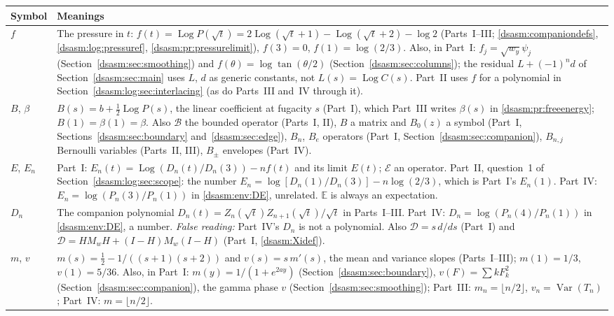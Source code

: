 \documentclass[11pt,letterpaper]{article}
\theoremstyle{remark}\newtheorem{remark}[theorem]{Remark}
\DeclareMathOperator{\Log}{Log}\DeclareMathOperator{\Var}{Var}
\begin{document}
\begin{longtable}{@{}>{\raggedright\arraybackslash}p{} >{\raggedright\arraybackslash}p{}@{}}
\toprule
Symbol & Meanings\\
\midrule
\endhead
$f$ & The pressure in $t$: $f(t)=\Log P(\sqrt t)=2\Log(\sqrt t+1)-\Log(\sqrt t+2)-\log2$ (Parts~I--III; \eqref{dsasm:companiondefs}, \eqref{dsasm:log:pressuref}, \eqref{dsasm:pr:pressurelimit}), $f(3)=0$, $f(1)=\log(2/3)$. Also, in Part~I: $f_j=\sqrt{w_y}\psi_j$ (Section~\ref{dsasm:sec:smoothing}) and $f(\theta)=\log\tan(\theta/2)$ (Section~\ref{dsasm:sec:columns}); the residual $L+(-1)^nd$ of Section~\ref{dsasm:sec:main} uses $L$, $d$ as generic constants, not $L(s)=\Log C(s)$. Part~II uses $f$ for a polynomial in Section~\ref{dsasm:log:sec:interlacing} (as do Parts~III and~IV through it).\\
$B$, $\beta$ & $B(s)=b+\frac12\Log P(s)$, the linear coefficient at fugacity $s$ (Part~I), which Part~III writes $\beta(s)$ in \eqref{dsasm:pr:freeenergy}; $B(1)=\beta(1)=\beta$. Also $\mathcal B$ the bounded operator (Parts~I, II), $B$ a matrix and $B_0(z)$ a symbol (Part~I, Sections~\ref{dsasm:sec:boundary} and~\ref{dsasm:sec:edge}), $B_n$, $B_e$ operators (Part~I, Section~\ref{dsasm:sec:companion}), $B_{n,j}$ Bernoulli variables (Parts~II, III), $B_\pm$ envelopes (Part~IV).\\
$E$, $E_n$ & Part~I: $E_n(t)=\Log(D_n(t)/D_n(3))-nf(t)$ and its limit $E(t)$; $\mathcal E$ an operator. Part~II, question~1 of Section~\ref{dsasm:log:sec:scope}: the number $E_n=\log[D_n(1)/D_n(3)]-n\log(2/3)$, which is Part~I's $E_n(1)$. Part~IV: $E_n=\log(P_n(3)/P_n(1))$ in \eqref{dsasm:env:DE}, unrelated. $\mathbb E$ is always an expectation.\\
$D_n$ & The companion polynomial $D_n(t)=Z_n(\sqrt t)Z_{n+1}(\sqrt t)/\sqrt t$ in Parts~I--III. Part~IV: $D_n=\log(P_n(4)/P_n(1))$ in \eqref{dsasm:env:DE}, a number. \emph{False reading:} Part~IV's $D_n$ is not a polynomial. Also $\mathcal D=s\,d/ds$ (Part~I) and $\mathcal D=HM_wH+(I-H)M_w(I-H)$ (Part~I, \eqref{dsasm:Xidef}).\\
$m$, $v$ & $m(s)=\frac12-1/((s+1)(s+2))$ and $v(s)=s\,m'(s)$, the mean and variance slopes (Parts~I--III); $m(1)=1/3$, $v(1)=5/36$. Also, in Part~I: $m(y)=1/(1+e^{2ay})$ (Section~\ref{dsasm:sec:boundary}), $v(F)=\sum kF_k^2$ (Section~\ref{dsasm:sec:companion}), the gamma phase $v$ (Section~\ref{dsasm:sec:smoothing}); Part~III: $m_n=\lfloor n/2\rfloor$, $v_n=\Var(T_n)$; Part~IV: $m=\lfloor n/2\rfloor$.\\

\end{longtable}
\end{document}

